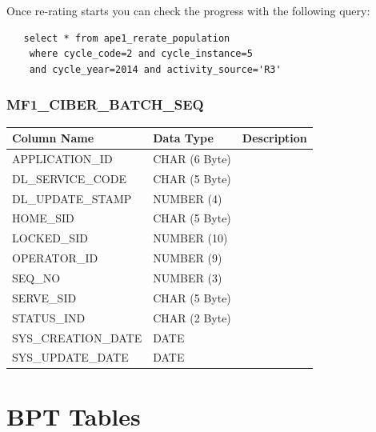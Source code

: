\documentclass[12pt,twoside]{article}
\begin{document}
\normalsize

  Once re-rating starts you can check the progress with the following query:
\begin{verbatim}
   select * from ape1_rerate_population 
    where cycle_code=2 and cycle_instance=5 
    and cycle_year=2014 and activity_source='R3'
\end{verbatim}
  
\subsubsection{MF1\_CIBER\_BATCH\_SEQ}
\label{sec-8-3-9}

\scriptsize

\begin{center}
\begin{tabular}{lll}
\hline
 \textbf{Column Name}  &  \textbf{Data Type}  &  \textbf{Description}  \\
\hline
 APPLICATION\_ID       &  CHAR (6 Byte)       &                        \\
 DL\_SERVICE\_CODE     &  CHAR (5 Byte)       &                        \\
 DL\_UPDATE\_STAMP     &  NUMBER (4)          &                        \\
 HOME\_SID             &  CHAR (5 Byte)       &                        \\
 LOCKED\_SID           &  NUMBER (10)         &                        \\
 OPERATOR\_ID          &  NUMBER (9)          &                        \\
 SEQ\_NO               &  NUMBER (3)          &                        \\
 SERVE\_SID            &  CHAR (5 Byte)       &                        \\
 STATUS\_IND           &  CHAR (2 Byte)       &                        \\
 SYS\_CREATION\_DATE   &  DATE                &                        \\
 SYS\_UPDATE\_DATE     &  DATE                &                        \\
\hline
\end{tabular}
\end{center}


\normalsize
\section{BPT Tables}
\label{sec-9}
\end{document}
